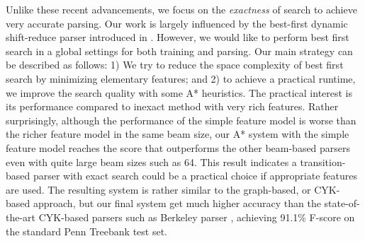 	Unlike these recent advancements, we focus on the \textit{exactness} of search to achieve very accurate parsing. Our work is largely influenced by the best-first dynamic shift-reduce parser introduced in . However, we would like to perform best first search in a global settings for both training and parsing. Our main strategy can be described as follows: 1) We try to reduce the space complexity of best first search by minimizing elementary features; and 2) to achieve a practical runtime, we improve the search quality with some A* heuristics. The practical interest is its performance compared to inexact method with very rich features. Rather surprisingly, although the performance of the simple feature model is worse than the richer feature model in the same beam size, our A* system with the simple feature model reaches the score that outperforms the other beam-based parsers even with quite large beam sizes such as 64. This result indicates a transition-based parser with exact search could be a practical choice if appropriate features are used. The resulting system is rather similar to the graph-based, or CYK-based approach, but our final system get much higher accuracy than the state-of-the-art CYK-based parsers such as Berkeley parser \cite{Petrov:2006:ACL}, achieving 91.1\% F-score on the standard Penn Treebank test set. 

	